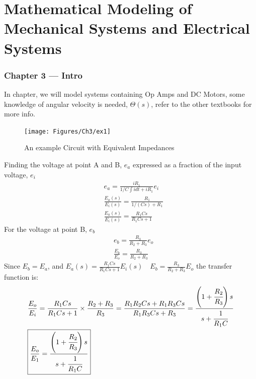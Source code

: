 \documentclass{beamer}
\begin{document}
\section{Mathematical Modeling of Mechanical Systems and Electrical Systems}
\begin{frame}[allowframebreaks]
\frametitle{Chapter 3 --- Intro}
In chapter, we will model systems containing \gls{Op Amps} and \gls{DC Motors}, some knowledge of angular velocity is needed, $\Theta(s)$, refer to the other textbooks for more info.
\begin{figure}
	\centering
	\texttt{[image: Figures/Ch3/ex1]}
	\caption{An example Circuit with Equivalent Impedances}
	\label{fig:chp3:ex1}
\end{figure}
Finding the voltage at point A and B, $e_a$ expressed as a fraction of the input voltage, $e_i$
\begin{align*}
& e_a = \frac{iR_1}{1/C \int i d t + iR_1}e_i \\
& \frac{E_a(s)}{E_i(s)} =\frac{R_1}{1 / (Cs) + R_1} \\
& \frac{E_a(s)}{E_i(s)} =\frac{R_1Cs}{R_1Cs+1}
\end{align*}
For the voltage at point B, $e_b$
\begin{align*}
& e_b =\frac{R_3}{R_2+R_3}e_o \\
& \frac{E_b}{E_o} = \frac{R_3}{R_2+R_3}
\end{align*}
Since $E_b= E_a$, and $\displaystyle E_a(s) =\frac{R_1Cs}{R_1Cs+1}E_i(s) \quad  E_b =\frac{R_3}{R_2+R_3}E_o$ the transfer function is:
\begin{align*}
& \frac{E_o}{E_i}=\frac{R_1Cs}{R_1Cs+1}\times \frac{R_2+R_3}{R_3}= \frac{R_1R_2Cs+R_1R_3Cs}{R_1R_3Cs + R_3} = \frac{\left(1+\cfrac{R_2}{R_3}\right)s}{s+\cfrac{1}{R_1C}} \\
& \boxed{\frac{E_o}{E_1} = \frac{\left(1+\cfrac{R_2}{R_3}\right)s}{s+\cfrac{1}{R_1C}}}
\end{align*}
\end{frame}
\end{document}
